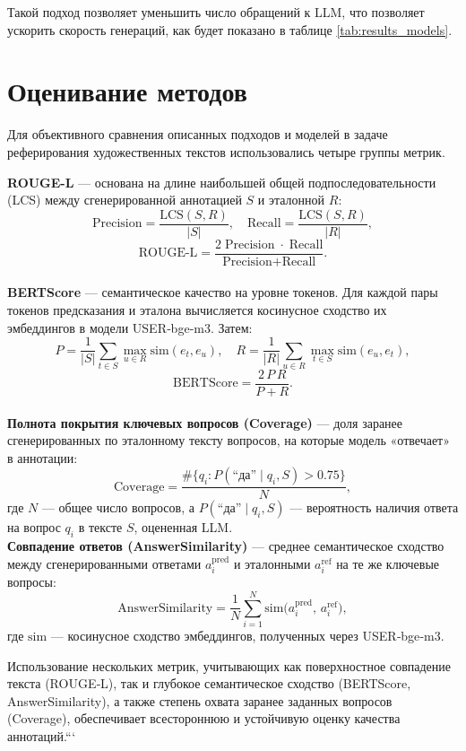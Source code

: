 \documentclass{article}
\theoremstyle{definition}
\theoremstyle{plain}
\begin{document}
Такой подход позволяет уменьшить число обращений к LLM, что позволяет ускорить скорость генераций, как будет показано в таблице \ref{tab:results_models}.

\section*{Оценивание методов}

Для объективного сравнения описанных подходов и моделей в задаче реферирования художественных текстов использовались четыре группы метрик.

\textbf{ROUGE-L} — основана на длине наибольшей общей подпоследовательности (LCS) между сгенерированной аннотацией $S$ и эталонной $R$:
    \[
      \text{Precision} = \frac{\mathrm{LCS}(S,R)}{|S|},\quad
      \text{Recall} = \frac{\mathrm{LCS}(S,R)}{|R|},
    \]
    \[
      \text{ROUGE‑L} = \frac{2\;\text{Precision}\;\cdot\;\text{Recall}}{\text{Precision} + \text{Recall}}.
    \]
\\ \textbf{BERTScore} — семантическое качество на уровне токенов. Для каждой пары токенов предсказания и эталона вычисляется косинусное сходство их эмбеддингов в модели USER‑bge‑m3. Затем:
    \[
      P = \frac{1}{|S|}\sum_{t\in S}\max_{u\in R}\!\mathrm{sim}(e_t, e_u),\quad
      R = \frac{1}{|R|}\sum_{u\in R}\max_{t\in S}\!\mathrm{sim}(e_u, e_t),
    \]
    \[
      \text{BERTScore} = \frac{2\,P\,R}{P+R}.
    \]
\\ \textbf{Полнота покрытия ключевых вопросов (Coverage)} — доля заранее сгенерированных по эталонному тексту вопросов, на которые модель «отвечает» в аннотации:
    \[
      \text{Coverage} = \frac{\#\{q_i\colon P(\text{“да”}\mid q_i,S)\!>\!0.75\}}{N},
    \]
    где $N$ — общее число вопросов, а $P(\text{“да”}\mid q_i,S)$ — вероятность наличия ответа на вопрос $q_i$ в тексте $S$, оцененная LLM.
\\ \textbf{Совпадение ответов (AnswerSimilarity)} — среднее семантическое сходство между сгенерированными ответами $a_i^{\text{pred}}$ и эталонными $a_i^{\text{ref}}$ на те же ключевые вопросы:
    \[
      \text{AnswerSimilarity}
      = \frac{1}{N}\sum_{i=1}^N \mathrm{sim}\bigl(a_i^{\text{pred}},\,a_i^{\text{ref}}\bigr),
    \]
    где $\mathrm{sim}$ — косинусное сходство эмбеддингов, полученных через USER‑bge‑m3.


Использование нескольких метрик, учитывающих как поверхностное совпадение текста (ROUGE‑L), так и глубокое семантическое сходство (BERTScore, AnswerSimilarity), а также степень охвата заранее заданных вопросов (Coverage), обеспечивает всестороннюю и устойчивую оценку качества аннотаций.```
\end{document}
